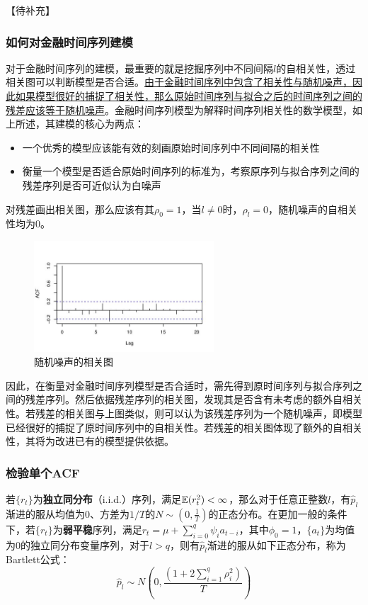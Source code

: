 \documentclass[11pt]{article}
\begin{document}
【待补充】

\subsubsection{如何对金融时间序列建模}

对于金融时间序列的建模，最重要的就是挖掘序列中不同间隔$l$的自相关性，透过相关图可以判断模型是否合适。\uline{由于金融时间序列中包含了相关性与随机噪声，因此如果模型很好的捕捉了相关性，那么原始时间序列与拟合之后的时间序列之间的残差应该等于随机噪声}。金融时间序列模型为解释时间序列相关性的数学模型，如上所述，其建模的核心为两点：
\begin{itemize}
    \item 一个优秀的模型应该能有效的刻画原始时间序列中不同间隔的相关性
    \item 衡量一个模型是否适合原始时间序列的标准为，考察原序列与拟合序列之间的残差序列是否可近似认为白噪声
\end{itemize}

对残差画出相关图，那么应该有其$\rho_0=1$，当$l\neq 0$时，$\rho_l=0$，随机噪声的自相关性均为0。

\begin{figure}[H]
    \centering
    \includegraphics[width=0.6\textwidth]{fig/white-noise-acf.jpg}
    \caption{随机噪声的相关图}
    \label{fig:white-noise-acf}
\end{figure}

因此，在衡量对金融时间序列模型是否合适时，需先得到原时间序列与拟合序列之间的残差序列。然后依据残差序列的相关图，发现其是否含有未考虑的额外自相关性。若残差的相关图与上图类似，则可以认为该残差序列为一个随机噪声，即模型已经很好的捕捉了原时间序列中的自相关性。若残差的相关图体现了额外的自相关性，其将为改进已有的模型提供依据。

\subsubsection*{检验单个ACF}

若$\{r_t\}$为\textbf{独立同分布}（i.i.d.）序列，满足$\mathbb{E}(r_t^2)<\infty$，那么对于任意正整数$l$，有$\hat{p}_l$渐进的服从均值为$0$、方差为$1/T$的$N\sim(0,\frac{1}{T})$的正态分布。在更加一般的条件下，若$\{r_t\}$为\textbf{弱平稳}序列，满足$r_t = \mu + \sum_{i=0}^{q}\psi_i a_{t-i}$，其中$\phi_0=1$，$\{a_t\}$为均值为0的独立同分布变量序列，对于$l>q$，则有$\hat{p}_l$渐进的服从如下正态分布，称为Bartlett公式：
\begin{equation*}
    \hat{p}_l \sim N\left(0,\frac{\left( 1+2\sum_{i=1}^{q}\rho_i^2 \right)}{T} \right)    
\end{equation*}
\end{document}
